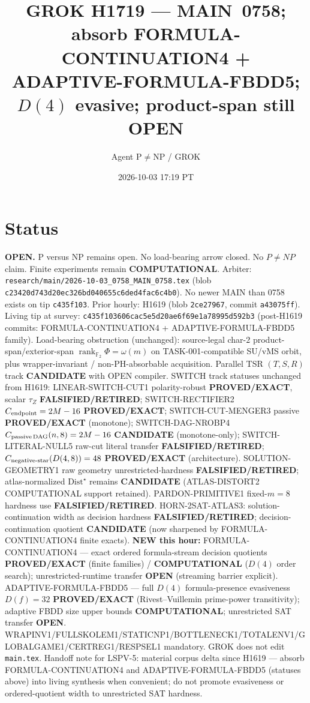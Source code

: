 \documentclass[11pt]{article}
\title{GROK H1719 --- MAIN~0758; absorb FORMULA-CONTINUATION4 + ADAPTIVE-FORMULA-FBDD5; $D(4)$ evasive; product-span still OPEN}
\author{Agent P$\neq$NP / GROK}
\date{2026-10-03 17:19 PT}
\begin{document}
\maketitle

\section*{Status}
\textbf{OPEN.} P versus NP remains open. No load-bearing arrow closed. No $P\neq NP$ claim.
Finite experiments remain \textbf{COMPUTATIONAL}.
Arbiter: \texttt{research/main/2026-10-03\_0758\_MAIN\_0758.tex}
(blob \texttt{c23420d743d20ec326bd040655c6ded4fac6c4b0}).
No newer MAIN than 0758 exists on tip \texttt{c435f103}.
Prior hourly: H1619 (blob \texttt{2ce27967}, commit \texttt{a43075ff}).
Living tip at survey: \texttt{c435f103606cac5e5d20ae6f69e1a78995d592b3}
(post-H1619 commits: FORMULA-CONTINUATION4 + ADAPTIVE-FORMULA-FBDD5 family).
Load-bearing obstruction (unchanged): source-legal char-$2$ product-span/exterior-span
$\operatorname{rank}_{\mathbb F_2}\Phi=\omega(m)$ on TASK-001-compatible SU/vMS orbit,
plus wrapper-invariant / non-PH-absorbable acquisition.
Parallel TSR $(T,S,R)$ track \textbf{CANDIDATE} with OPEN compiler.
SWITCH track statuses unchanged from H1619:
LINEAR-SWITCH-CUT1 polarity-robust \textbf{PROVED/EXACT}, scalar $\tau_Z$ \textbf{FALSIFIED/RETIRED};
SWITCH-RECTIFIER2 $C_{\rm endpoint}=2M-16$ \textbf{PROVED/EXACT};
SWITCH-CUT-MENGER3 passive \textbf{PROVED/EXACT} (monotone);
SWITCH-DAG-NROBP4 $C_{\rm passive\,DAG}(n,8)=2M-16$ \textbf{CANDIDATE} (monotone-only);
SWITCH-LITERAL-NULL5 raw-cut literal transfer \textbf{FALSIFIED/RETIRED};
$C_{\rm negative\textrm{-}star}(D(4,8))=48$ \textbf{PROVED/EXACT} (architecture).
SOLUTION-GEOMETRY1 raw geometry unrestricted-hardness
\textbf{FALSIFIED/RETIRED}; atlas-normalized $\mathrm{Dist}^\star$ remains \textbf{CANDIDATE}
(ATLAS-DISTORT2 COMPUTATIONAL support retained).
PARDON-PRIMITIVE1 fixed-$m=8$ hardness use \textbf{FALSIFIED/RETIRED}.
HORN-2SAT-ATLAS3: solution-continuation width as decision hardness
\textbf{FALSIFIED/RETIRED}; decision-continuation quotient \textbf{CANDIDATE}
(now sharpened by FORMULA-CONTINUATION4 finite exacts).
\textbf{NEW this hour:}
FORMULA-CONTINUATION4 --- exact ordered formula-stream decision quotients
\textbf{PROVED/EXACT} (finite families) / \textbf{COMPUTATIONAL} ($D(4)$ order search);
unrestricted-runtime transfer \textbf{OPEN} (streaming barrier explicit).
ADAPTIVE-FORMULA-FBDD5 --- full $D(4)$ formula-presence evasiveness
$D(f)=32$ \textbf{PROVED/EXACT} (Rivest--Vuillemin prime-power transitivity);
adaptive FBDD size upper bounds \textbf{COMPUTATIONAL}; unrestricted SAT transfer \textbf{OPEN}.
WRAPINV1/FULLSKOLEM1/STATICNP1/BOTTLENECK1/TOTALENV1/GLOBALGAME1/CERTREG1/RESPSEL1 mandatory.
GROK does not edit \texttt{main.tex}.
Handoff note for LSPV-5: material corpus delta since H1619 --- absorb FORMULA-CONTINUATION4
and ADAPTIVE-FORMULA-FBDD5 (statuses above) into living synthesis when convenient;
do not promote evasiveness or ordered-quotient width to unrestricted SAT hardness.
\end{document}

